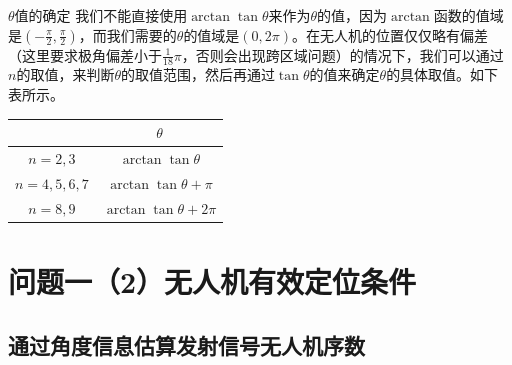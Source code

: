 \documentclass[aspectratio=169]{beamer}
\begin{document}
\begin{frame}{$\theta$值的确定}
    我们不能直接使用$\arctan\tan\theta$来作为$\theta$的值，因为$\arctan$函数的值域是$\left(-\frac{\pi}{2},\frac{\pi}{2}\right)$，而我们需要的$\theta$的值域是$\left(0,2\pi\right)$。在无人机的位置仅仅略有偏差（这里要求极角偏差小于$\frac{1}{18}\pi$，否则会出现跨区域问题）的情况下，我们可以通过$n$的取值，来判断$\theta$的取值范围，然后再通过$\tan\theta$的值来确定$\theta$的具体取值。如下表所示。
    \begin{table}[!ht]
        \centering
        \begin{tabular}{cc}
            \toprule
            ~  &  $\theta$\\
            \midrule
            $n=2,3$ & $\arctan\tan\theta$\\
            $n=4,5,6,7$ & $\arctan\tan\theta + \pi$\\
            $n=8,9$ & $\arctan\tan\theta + 2\pi$\\
            \bottomrule
        \end{tabular}
    \end{table}
\end{frame}


\section[问题1-2]{问题一（2）无人机有效定位条件}

\subsection{通过角度信息估算发射信号无人机序数}
\end{document}

